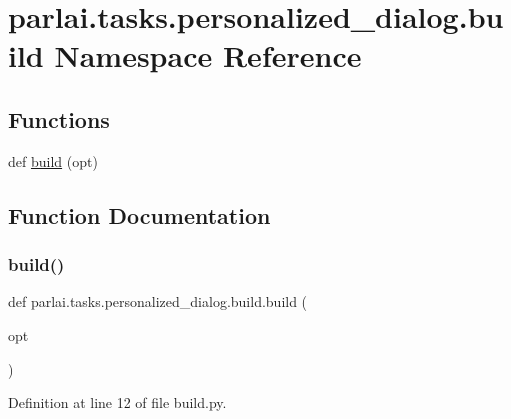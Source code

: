 \hypertarget{namespaceparlai_1_1tasks_1_1personalized__dialog_1_1build}{}\section{parlai.\+tasks.\+personalized\+\_\+dialog.\+build Namespace Reference}
\label{namespaceparlai_1_1tasks_1_1personalized__dialog_1_1build}
\subsection*{Functions}
\begin{DoxyCompactItemize}
\item 
def \hyperlink{namespaceparlai_1_1tasks_1_1personalized__dialog_1_1build_a8e2486f9cfd8af50e1da077ea5ed7c5e}{build} (opt)
\end{DoxyCompactItemize}


\subsection{Function Documentation}
\mbox{\label{namespaceparlai_1_1tasks_1_1personalized__dialog_1_1build_a8e2486f9cfd8af50e1da077ea5ed7c5e}} 
\subsubsection{\texorpdfstring{build()}{build()}}
{\footnotesize\ttfamily def parlai.\+tasks.\+personalized\+\_\+dialog.\+build.\+build (\begin{DoxyParamCaption}\item[{}]{opt }\end{DoxyParamCaption})}



Definition at line 12 of file build.\+py.

